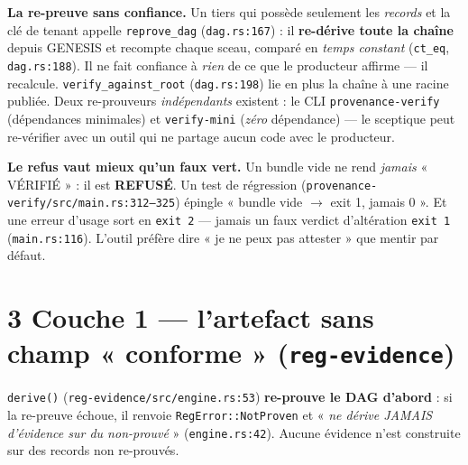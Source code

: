 \documentclass[11pt]{article}
\begin{document}
\textbf{La re-preuve sans confiance.} Un tiers qui possède seulement les \emph{records} et la
clé de tenant appelle \texttt{reprove\_dag} (\texttt{dag.rs:167}) : il \textbf{re-dérive toute la
chaîne} depuis GENESIS et recompte chaque sceau, comparé en \emph{temps constant}
(\texttt{ct\_eq}, \texttt{dag.rs:188}). Il ne fait confiance à \emph{rien} de ce que le producteur
affirme — il recalcule. \texttt{verify\_against\_root} (\texttt{dag.rs:198}) lie en plus la chaîne
à une racine publiée. Deux re-prouveurs \emph{indépendants} existent : le CLI
\texttt{provenance-verify} (dépendances minimales) et \texttt{verify-mini} (\emph{zéro}
dépendance) — le sceptique peut re-vérifier avec un outil qui ne partage aucun code avec le
producteur.

\begin{cadre}
\textbf{Le refus vaut mieux qu'un faux vert.} Un bundle vide ne rend \emph{jamais} « VÉRIFIÉ » :
il est \textbf{REFUSÉ}. Un test de régression (\texttt{provenance-verify/src/main.rs:312--325})
épingle « bundle vide $\rightarrow$ exit 1, jamais 0 ». Et une erreur d'usage sort en \texttt{exit 2} — jamais un faux verdict
d'altération \texttt{exit 1} (\texttt{main.rs:116}). L'outil préfère dire « je ne peux pas
attester » que mentir par défaut.
\end{cadre}

\section{3 \;\textbar\; Couche 1 — l'artefact sans champ « conforme » (\texttt{reg-evidence})}
\texttt{derive()} (\texttt{reg-evidence/src/engine.rs:53}) \textbf{re-prouve le DAG d'abord} : si
la re-preuve échoue, il renvoie \texttt{RegError::NotProven} et « \emph{ne dérive JAMAIS
d'évidence sur du non-prouvé} » (\texttt{engine.rs:42}). Aucune évidence n'est construite sur des
records non re-prouvés.
\end{document}
